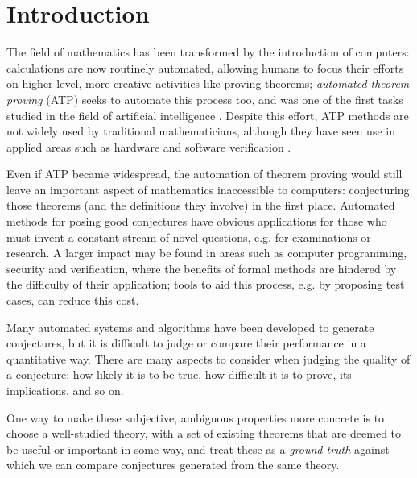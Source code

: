 \section{Introduction}
\label{intro}




The field of mathematics has been transformed by the introduction of computers:
calculations are now routinely automated, allowing humans to focus their efforts
on higher-level, more creative activities like proving theorems; \emph{automated
theorem proving} (ATP) seeks to automate this process too, and was one of the
first tasks studied in the field of artificial intelligence
\cite{newell1956logic,sutcliffe2001evaluating}. Despite this effort, ATP
methods are not widely used by traditional mathematicians, although they have
seen use in applied areas such as hardware and software verification
\cite{Moore:2003}.


Even if ATP became widespread, the automation of theorem proving would still
leave an important aspect of mathematics inaccessible to computers: conjecturing
those theorems (and the definitions they involve) in the first place. Automated
methods for posing good conjectures have obvious applications for those who must
invent a constant stream of novel questions, e.g. for examinations or research.
A larger impact may be found in areas such as computer programming, security and
verification, where the benefits of formal methods are hindered by the
difficulty of their application; tools to aid this process, e.g. by proposing
test cases, can reduce this cost.

Many automated systems and algorithms have been developed to generate
conjectures, but it is difficult to judge or compare their performance in a
quantitative way. There are many aspects to consider when judging the quality of
a conjecture: how likely it is to be true, how difficult it is to prove, its
implications, and so on.

One way to make these subjective, ambiguous properties more concrete is to
choose a well-studied theory, with a set of existing theorems that are deemed to
be useful or important in some way, and treat these as a \emph{ground truth}
against which we can compare conjectures generated from the same theory.

